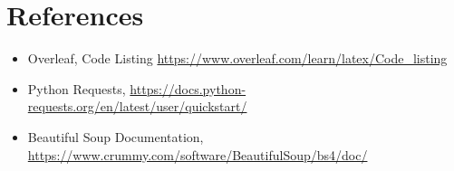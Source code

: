 \documentclass[12pt]{article}
\begin{document}
\section*{References}

\begin{itemize}
    \item {Overleaf, Code Listing \url{https://www.overleaf.com/learn/latex/Code_listing}}
    \item{Python Requests, \url{https://docs.python-requests.org/en/latest/user/quickstart/}}
    \item{Beautiful Soup Documentation, \url{https://www.crummy.com/software/BeautifulSoup/bs4/doc/}}
\end{itemize}
\end{document}
